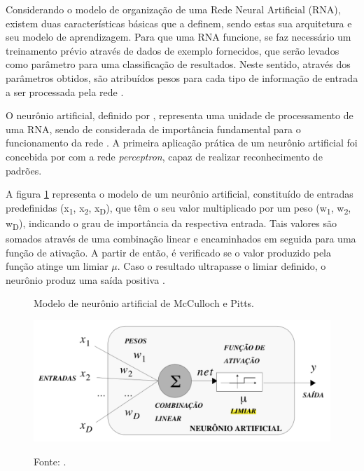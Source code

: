 Considerando o modelo de organização de uma Rede Neural Artificial (RNA), existem duas características básicas que a definem, sendo estas sua arquitetura e seu modelo de aprendizagem. Para que uma RNA funcione, se faz necessário um treinamento prévio através de dados de exemplo fornecidos, que serão levados como parâmetro para uma classificação de resultados. Neste sentido, através dos parâmetros obtidos, são atribuídos pesos para cada tipo de informação de entrada a ser processada pela rede \cite{thomas2019}.

O neurônio artificial, definido por , representa uma unidade de processamento de uma RNA, sendo de considerada de importância fundamental para o funcionamento da rede \cite{haykin2007redes}. A primeira aplicação prática de um neurônio artificial foi concebida por  com a rede \textit{perceptron}, capaz de realizar reconhecimento de padrões.

A figura \ref{figura:modelo_neuronio} representa o modelo de um neurônio artificial, constituído de entradas predefinidas (x\textsubscript{1}, x\textsubscript{2}, x\textsubscript{D}), que têm o seu valor multiplicado por um peso (w\textsubscript{1}, w\textsubscript{2}, w\textsubscript{D}), indicando o grau de importância da respectiva entrada. Tais valores são somados através de uma combinação linear e encaminhados em seguida para uma função de ativação. A partir de então, é verificado se o valor produzido pela função atinge um limiar \(\mu\). Caso o resultado ultrapasse o limiar definido, o neurônio produz uma saída positiva \cite{thomas2019}.

\begin{figure}[H]
	\caption{Modelo de neurônio artificial de McCulloch e Pitts.}
	\centering %
	\includegraphics[width=12cm]{resources/modelo_neuronio.png} %
	\label{figura:modelo_neuronio}
	\captionsetup{singlelinecheck = false, format= hang, justification=raggedright, labelsep=space, width=12cm}
	\caption*{\footnotesize Fonte: .}
\end{figure}

